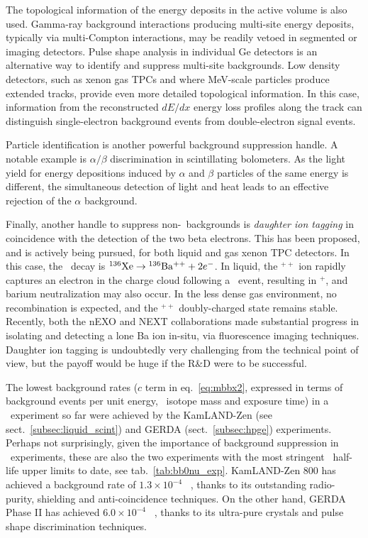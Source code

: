 The topological information of the energy deposits in the active volume is also used. Gamma-ray background interactions producing multi-site energy deposits, typically via multi-Compton interactions, may be readily vetoed in segmented or imaging detectors. Pulse shape analysis in individual Ge detectors is an alternative way to identify and suppress multi-site backgrounds. Low density detectors, such as xenon gas TPCs and where MeV-scale particles produce extended tracks, provide even more detailed topological information. In this case, information from the reconstructed $dE/dx$ energy loss profiles along the track can distinguish single-electron background events from double-electron signal events.

Particle identification is another powerful background suppression handle. A notable example is $\alpha/\beta$ discrimination in scintillating bolometers. As the light yield for energy depositions induced by $\alpha$ and $\beta$ particles of the same energy is different, the simultaneous detection of light and heat leads to an effective rejection of the $\alpha$ background. 

Finally, another handle to suppress non-\bbtnu\ backgrounds is \emph{daughter ion tagging} in coincidence with the detection of the two beta electrons. This has been proposed, and is actively being pursued, for both liquid and gas xenon TPC detectors. In this case, the \bbonu\ decay is ${\rm ^{136}Xe}\to {\rm ^{136}Ba^{++}}+2e^-$. In liquid, the $^{++}$ ion rapidly captures an electron in the charge cloud following a \bb\ event, resulting in $^{+}$, and barium neutralization may also occur. In the less dense gas environment, no recombination is expected, and the $^{++}$ doubly-charged state remains stable. Recently, both the nEXO \cite{nEXO:2018nxx} and NEXT \cite{McDonald:2017izm,Rivilla:2020cvm} collaborations made substantial progress in isolating and detecting a lone Ba ion in-situ, via fluorescence imaging techniques. Daughter ion tagging is undoubtedly very challenging from the technical point of view, but the payoff would be huge if the R\&D were to be successful.

The lowest background rates ($c$ term in eq.~\ref{eq:mbbx2}, expressed in terms of background events per unit energy, \bb\ isotope mass and exposure time) in a \bbonu\ experiment so far were achieved by the KamLAND-Zen (see sect.~\ref{subsec:liquid_scint}) and GERDA (sect.~\ref{subsec:hpge}) experiments. Perhaps not surprisingly, given the importance of background suppression in \bbonu\ experiments, these are also the two experiments with the most stringent \bbonu\ half-life upper limits to date, see tab.~\ref{tab:bb0nu_exp}. KamLAND-Zen 800 has achieved a background rate of $1.3\times 10^{-4}$ \ckkbby\ \cite{KamLAND-Zen:2022tow}, thanks to its outstanding radio-purity, shielding and anti-coincidence techniques. On the other hand, GERDA Phase II has achieved $6.0\times 10^{-4}$ \ckkbby\ \cite{GERDA:2020xhi}, thanks to its ultra-pure crystals and pulse shape discrimination techniques. 

